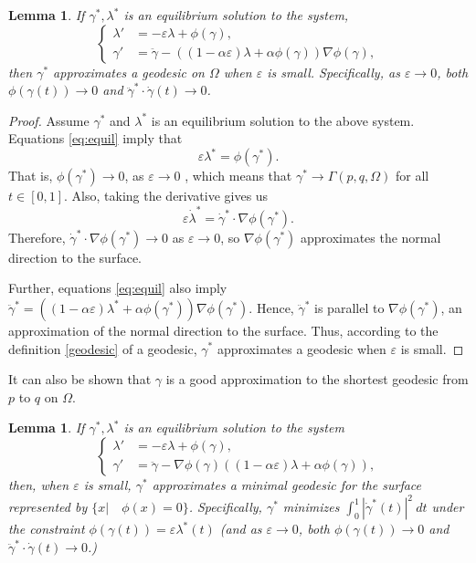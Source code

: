 \documentclass[12pt]{amsart}
\newtheorem{lemma}[theorem]{Lemma}
\theoremstyle{definition}
\theoremstyle{remark}
\numberwithin{equation}{section}
\numberwithin{equation}{section}
\begin{document}
\begin{lemma}\label{lem:approx_geo}
    If $\gamma^*, \lambda^*$ is an equilibrium solution to the system, 
    \[\begin{cases}
        \lambda' & = -\varepsilon\lambda + \phi(\gamma),\\
        \gamma' & = \ddot{\gamma} - ((1-\alpha\varepsilon)\lambda + \alpha\phi(\gamma))\nabla\phi(\gamma),
    \end{cases}\]
    then $\gamma^*$ approximates a geodesic on $\Omega$ when $\varepsilon$ is small. Specifically, as $\varepsilon \to 0$, both $\phi(\gamma(t)) \to 0$ and $\ddot{\gamma}^*\cdot \dot{\gamma}(t) \to 0$. 
\end{lemma}
\begin{proof} 
    Assume $\gamma^*$ and $\lambda^*$ is an equilibrium solution to the above system.
    Equations \ref{eq:equil} imply that 
    \[\varepsilon \lambda^* = \phi(\gamma^*).\]
    That is, $\phi(\gamma^*) \to 0$, as $\varepsilon\to 0$ , which means that $\gamma^*\to \Gamma(p,q,\Omega)$ for all $t\in[0,1]$.
    Also, taking the derivative gives us 
    \begin{equation}
    \varepsilon \dot{\lambda}^* = \dot{\gamma}^*\cdot\nabla\phi(\gamma^*).
    \end{equation}
     {Therefore, $\dot{\gamma}^*\cdot\nabla\phi(\gamma^*)\to 0$ as $\varepsilon \to 0$, so $\nabla\phi(\gamma^*)$ approximates the normal direction to the surface.}

    Further, equations \ref{eq:equil} also imply $\ddot{\gamma}^* = ((1-\alpha\varepsilon)\lambda^* + \alpha\phi(\gamma^*))\nabla\phi(\gamma^*)$.
    {Hence, $\ddot{\gamma}^*$ is parallel to $\nabla\phi(\gamma^*)$, an approximation of the normal direction to the surface.} 
    Thus, according to the definition \ref{geodesic} of a geodesic, $\gamma^*$ approximates a geodesic when $\varepsilon$ is small.  
\end{proof}

It can also be shown that $\gamma$ is a good approximation to the shortest geodesic from $p$ to $q$ on $\Omega$.

\begin{lemma}\label{lem:min_geo}
    If $\gamma^*, \lambda^*$ is an equilibrium solution to the system
   \[\begin{cases}
        \lambda' & = -\varepsilon\lambda + \phi(\gamma),\\
        \gamma' & = \ddot{\gamma} - \nabla\phi(\gamma)((1-\alpha\varepsilon)\lambda + \alpha\phi(\gamma)),
    \end{cases}\]
    then, when $\varepsilon$ is small, $\gamma^*$ approximates a minimal geodesic for the surface represented by $\{x|\quad  \phi(x)=0\}$. %
    Specifically, $\gamma^*$ minimizes $\int_0^1|\dot{\gamma}^*(t)|^2~dt$ under the constraint $\phi(\gamma(t)) = \varepsilon\lambda^*(t)$ (and as $\varepsilon \to 0$, both $\phi(\gamma(t)) \to 0$ and $\ddot{\gamma}^*\cdot \dot{\gamma}(t) \to 0$.)
\end{lemma}
\end{document}
